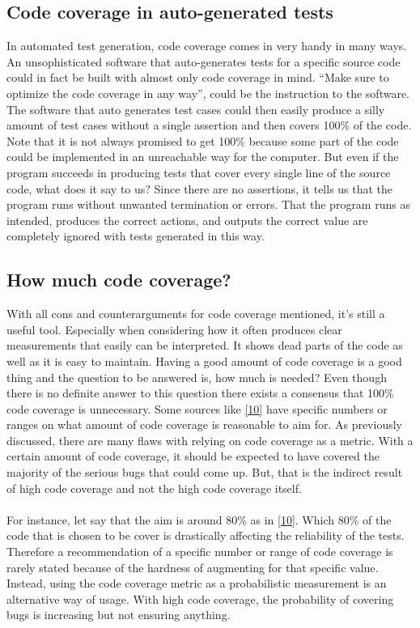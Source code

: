 \documentclass{article}
\begin{document}
\subsection{Code coverage in auto-generated tests}
In automated test generation, code coverage comes in very handy in many ways. An unsophisticated software that auto-generates tests for a specific source code could in fact be built with almost only code coverage in mind. “Make sure to optimize the code coverage in any way”, could be the instruction to the software. The software that auto generates test cases could then easily produce a silly amount of test cases without a single assertion and then covers 100\% of the code. Note that it is not always promised to get 100\% because some part of the code could be implemented in an unreachable way for the computer. But even if the program succeeds in producing tests that cover every single line of the source code, what does it say to us? Since there are no assertions, it tells us that the program runs without unwanted termination or errors. That the program runs as intended, produces the correct actions, and outputs the correct value are completely ignored with tests generated in this way.

\subsection{How much code coverage?}
With all cons and counterarguments for code coverage mentioned, it's still a useful tool. Especially when considering how it often produces clear measurements that easily can be interpreted. It shows dead parts of the code as well as it is easy to maintain. Having a good amount of code coverage is a good thing and the question to be answered is, how much is needed? Even though there is no definite answer to this question there exists a consensus that 100\% code coverage is unnecessary. Some sources like \hyperlink{10}{[10]} have specific numbers or ranges on what amount of code coverage is reasonable to aim for. As previously discussed, there are many flaws with relying on code coverage as a metric. With a certain amount of code coverage, it should be expected to have covered the majority of the serious bugs that could come up. But, that is the indirect result of high code coverage and not the high code coverage itself.
\\\\
For instance, let say that the aim is around 80\% as in \hyperlink{10}{[10]}. Which 80\% of the code that is chosen to be cover is drastically affecting the reliability of the tests. Therefore a recommendation of a specific number or range of code coverage is rarely stated because of the hardness of augmenting for that specific value. Instead, using the code coverage metric as a probabilistic measurement is an alternative way of usage. With high code coverage, the probability of covering bugs is increasing but not ensuring anything.
\end{document}
